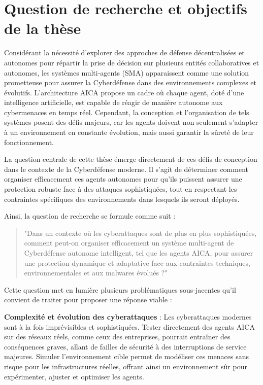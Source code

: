 \section{Question de recherche et objectifs de la thèse}

Considérant la nécessité d'explorer des approches de défense décentralisées et autonomes pour répartir la prise de décision sur plusieurs entités collaboratives et autonomes, les systèmes multi-agents (SMA) apparaissent comme une solution prometteuse pour assurer la Cyberdéfense dans des environnements complexes et évolutifs. L'architecture AICA propose un cadre où chaque agent, doté d'une intelligence artificielle, est capable de réagir de manière autonome aux cybermenaces en temps réel. Cependant, la conception et l'organisation de tels systèmes posent des défis majeurs, car les agents doivent non seulement s'adapter à un environnement en constante évolution, mais aussi garantir la sûreté de leur fonctionnement.

La question centrale de cette thèse émerge directement de ces défis de conception dans le contexte de la Cyberdéfense moderne. Il s'agit de déterminer comment organiser efficacement ces agents autonomes pour qu'ils puissent assurer une protection robuste face à des attaques sophistiquées, tout en respectant les contraintes spécifiques des environnements dans lesquels ils seront déployés.

Ainsi, la question de recherche se formule comme suit :

\begin{quote}
    "Dans un contexte où les cyberattaques sont de plus en plus sophistiquées, comment peut-on organiser efficacement un système multi-agent de Cyberdéfense autonome intelligent, tel que les agents AICA, pour assurer une protection dynamique et adaptative face aux contraintes techniques, environnementales et aux malwares évolués ?"
\end{quote}

Cette question met en lumière plusieurs problématiques sous-jacentes qu'il convient de traiter pour proposer une réponse viable :

\textbf{Complexité et évolution des cyberattaques} : Les cyberattaques modernes sont à la fois imprévisibles et sophistiquées. Tester directement des agents AICA sur des réseaux réels, comme ceux des entreprises, pourrait entraîner des conséquences graves, allant de failles de sécurité à des interruptions de service majeures. Simuler l’environnement cible permet de modéliser ces menaces sans risque pour les infrastructures réelles, offrant ainsi un environnement sûr pour expérimenter, ajuster et optimiser les agents.


